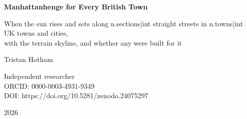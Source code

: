 \documentclass[11pt,a4paper]{article}
\begin{document}
\begin{center}
{\Large\bfseries Manhattanhenge for Every British Town\par}
\vspace{0.4em}
{\large When the sun rises and sets along {{n.sections|int}} straight streets in {{n.towns|int}} UK towns and cities,\\with the terrain skyline, and whether any were built for it\par}
\vspace{1.2em}
{\large Tristan Hotham\par}
\vspace{0.3em}
{\small Independent researcher\\
ORCID: 0000-0003-4931-9349\\
DOI: https://doi.org/10.5281/zenodo.24075297\par}
\vspace{0.8em}
2026
\end{center}
\end{document}
